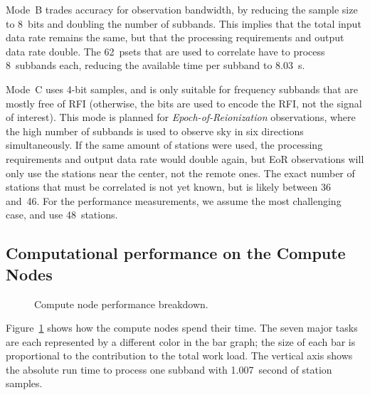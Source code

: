 \documentclass[10pt]{article}
\begin{document}
Mode~\textsf{B} trades accuracy for observation bandwidth, by reducing the
sample size to 8~bits and doubling the number of subbands.
This implies that the total input data rate remains the same, but that the
processing requirements and output data rate double.
The 62~psets that are used to correlate have to process 8~subbands each,
reducing the available time per subband to 8.03~s.

Mode~\textsf{C} uses 4-bit samples, and is only suitable for frequency
subbands that are mostly free of RFI (otherwise, the bits are used to encode
the RFI, not the signal of interest).
This mode is planned for \emph{Epoch-of-Reionization} observations, where the high number of subbands
is used to observe sky in six directions simultaneously.
If the same amount of stations were used, the processing requirements and
output data rate would double again, but EoR observations will only use the
stations near the center, not the remote ones.
The exact number of stations that must be correlated is not yet known, but is
likely between 36 and~46.
For the performance measurements, we assume the most challenging case, and use 48~stations.


\subsection{Computational performance on the Compute Nodes}

\begin{figure}
\hspace{9mm}
\hspace{0.8cm}
\caption{Compute node performance breakdown.}
\label{fig:cn-performance}
\end{figure}

Figure~\ref{fig:cn-performance} shows how the compute nodes spend their time.
The seven major tasks are each represented by a different color in the bar
graph; the size of each bar is proportional to the contribution to the total
work load.
The vertical axis shows the absolute run time to process one subband with
1.007~second of station samples.
\end{document}
